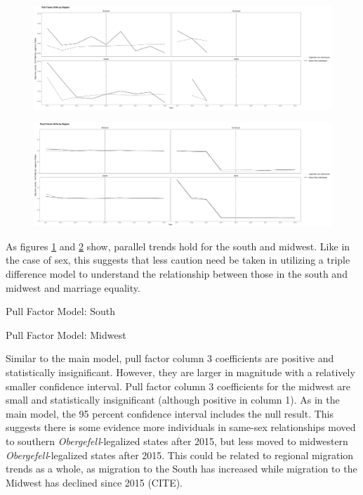 \documentclass[12pt,letterpaper]{article}
\begin{document}
\begin{figure}[htbp]
    \centering
    \includegraphics[width=1\linewidth]{outputs/summary_stats/region_post_diffs.png}
    \caption{}
    \label{fig: region_post_diffs}
\end{figure}

\begin{figure}[htbp]
    \centering
    \includegraphics[width=1\linewidth]{outputs/summary_stats/region_ante_diffs.png}
    \caption{}
    \label{fig: region_ante_diffs}
\end{figure}

\floatBarrier
As figures \ref{fig: region_post_diffs} and \ref{fig: region_ante_diffs} show, parallel trends hold for the south and midwest. Like in the case of sex, this suggests that less caution need be taken in utilizing a triple difference model to understand the relationship between those in the south and midwest and marriage equality. 
\begin{table}[htbp]
    \centering
    \caption{Pull Factor Model: South}
    \label{tab: south_expost_model}
    
\end{table}
\begin{table}[htbp]
    \centering
    \caption{Pull Factor Model: Midwest}
    \label{tab: midwest_expost_model}
    
\end{table}
Similar to the main model, pull factor column 3 coefficients are positive and statistically insignificant. However, they are larger in magnitude with a relatively smaller confidence interval. Pull factor column 3 coefficients for the midwest are small and statistically insignificant (although positive in column 1).  As in the main model, the 95 percent confidence interval includes the null result. This suggests there is some evidence more individuals in same-sex relationships moved to southern \textit{Obergefell}-legalized states after 2015, but less moved to midwestern \textit{Obergefell}-legalized states after 2015. This could be related to regional migration trends as a whole, as migration to the South has increased while migration to the Midwest has declined since 2015 (CITE). 
\end{document}
